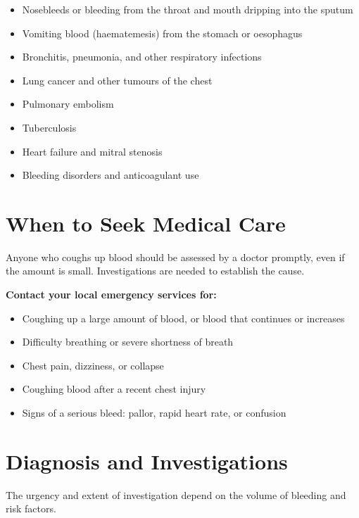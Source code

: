 \begin{itemize}
    \item Nosebleeds or bleeding from the throat and mouth dripping into the sputum
    \item Vomiting blood (haematemesis) from the stomach or oesophagus
    \item Bronchitis, pneumonia, and other respiratory infections
    \item Lung cancer and other tumours of the chest
    \item Pulmonary embolism
    \item Tuberculosis
    \item Heart failure and mitral stenosis
    \item Bleeding disorders and anticoagulant use
\end{itemize}

\section*{When to Seek Medical Care}
Anyone who coughs up blood should be assessed by a doctor promptly, even if the amount is small. Investigations are needed to establish the cause.

\textbf{Contact your local emergency services for:}
\begin{itemize}
    \item Coughing up a large amount of blood, or blood that continues or increases
    \item Difficulty breathing or severe shortness of breath
    \item Chest pain, dizziness, or collapse
    \item Coughing blood after a recent chest injury
    \item Signs of a serious bleed: pallor, rapid heart rate, or confusion
\end{itemize}

\section*{Diagnosis and Investigations}
The urgency and extent of investigation depend on the volume of bleeding and risk factors.

